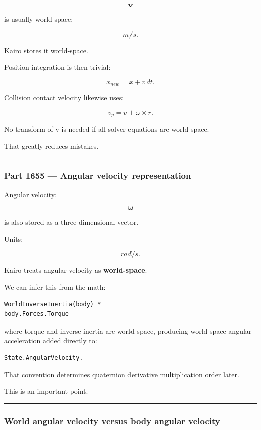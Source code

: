 \[
\mathbf v
\]

is usually world-space:

\[
m/s.
\]

Kairo stores it world-space.

Position integration is then trivial:

\[
x_{new}=x+v\,dt.
\]

Collision contact velocity likewise uses:

\[
v_p
=
v+
\omega\times r.
\]

No transform of v is needed if all solver equations are world-space.

That greatly reduces mistakes.

\begin{center}\rule{0.5\linewidth}{0.5pt}\end{center}

\subsubsection{Part 1655 --- Angular velocity representation}\label{part-1655-angular-velocity-representation}

Angular velocity:

\[
\boldsymbol\omega
\]

is also stored as a three-dimensional vector.

Units:

\[
rad/s.
\]

Kairo treats angular velocity as \textbf{world-space}.

We can infer this from the math:

\begin{verbatim}
WorldInverseInertia(body) *
body.Forces.Torque
\end{verbatim}

where torque and inverse inertia are world-space, producing world-space angular acceleration added directly to:

\begin{verbatim}
State.AngularVelocity.
\end{verbatim}

That convention determines quaternion derivative multiplication order later.

This is an important point.

\begin{center}\rule{0.5\linewidth}{0.5pt}\end{center}

\subsubsection{World angular velocity versus body angular velocity}\label{world-angular-velocity-versus-body-angular-velocity}

